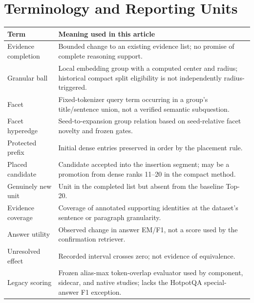\documentclass[11pt,a4paper]{article}
\begin{document}
\section{Terminology and Reporting Units}
\begin{longtable}{@{}p{}p{}@{}}
\toprule
Term & Meaning used in this article\\
\midrule
\endhead
Evidence completion & Bounded change to an existing evidence list; no promise
of complete reasoning support.\\
Granular ball & Local embedding group with a computed center and radius;
historical compact split eligibility is not independently radius-triggered.\\
Facet & Fixed-tokenizer query term occurring in a group's title/sentence union,
not a verified semantic subquestion.\\
Facet hyperedge & Seed-to-expansion group relation based on seed-relative
facet novelty and frozen gates.\\
Protected prefix & Initial dense entries preserved in order by the placement rule.\\
Placed candidate & Candidate accepted into the insertion segment; may be a
promotion from dense ranks 11--20 in the compact method.\\
Genuinely new unit & Unit in the completed list but absent from the baseline Top-20.\\
Evidence coverage & Coverage of annotated supporting identities at the
dataset's sentence or paragraph granularity.\\
Answer utility & Observed change in answer EM/F1, not a score used by the
confirmation retriever.\\
Unresolved effect & Recorded interval crosses zero; not evidence of equivalence.\\
Legacy scoring & Frozen alias-max token-overlap evaluator used by component,
sidecar, and native studies; lacks the HotpotQA special-answer F1 exception.\\
\bottomrule
\end{longtable}
\end{document}

